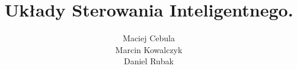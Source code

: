\documentclass[12pt]{report}
\title{\textbf{Układy Sterowania Inteligentnego.}}
\author{Maciej Cebula \\Marcin Kowalczyk \\ Daniel Rubak}
\date{}
\begin{document}
	

	\setcounter{tocdepth}{2}
	
	\maketitle
	\tableofcontents
	\clearpage
		
		\renewcommand{\tablename}{Tabela}
		\renewcommand{\figurename}{Rys.}
		
	
	
	
	
	
	
	
	
\end{document}
